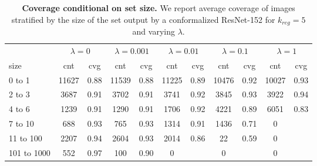 \begin{table}[t]
\centering
\small
\begin{tabular}{lcccccccccc} 
\toprule
         & \multicolumn{2}{c}{$\lambda={0}$}     & \multicolumn{2}{c}{$\lambda={0.001}$}     & \multicolumn{2}{c}{$\lambda={0.01}$}     & \multicolumn{2}{c}{$\lambda={0.1}$}     & \multicolumn{2}{c}{$\lambda={1}$}    \\ 
         \cmidrule(r){1-2}     \cmidrule(r){3-4}     \cmidrule(r){5-6}     \cmidrule(r){7-8}     \cmidrule(r){9-10}    
size &cnt & cvg     &cnt & cvg     &cnt & cvg     &cnt & cvg     &cnt & cvg     \\ 
\midrule 
0 to 1      & 11627 & 0.88  & 11539 & 0.88  & 11225 & 0.89  & 10476 & 0.92  & 10027 & 0.93 \\ 
2 to 3      & 3687 & 0.91  & 3702 & 0.91  & 3741 & 0.92  & 3845 & 0.93  & 3922 & 0.94 \\ 
4 to 6      & 1239 & 0.91  & 1290 & 0.91  & 1706 & 0.92  & 4221 & 0.89  & 6051 & 0.83 \\ 
7 to 10      & 688 & 0.93  & 765 & 0.93  & 1314 & 0.91  & 1436 & 0.71  & 0 & \\ 
11 to 100      & 2207 & 0.94  & 2604 & 0.93  & 2014 & 0.86  & 22 & 0.59  & 0 & \\ 
101 to 1000      & 552 & 0.97  & 100 & 0.90  & 0 &  & 0 &  & 0 & \\ 
\bottomrule
\end{tabular}
\caption{\textbf{Coverage conditional on set size.} We report average coverage of images stratified by the size of the set output by a conformalized ResNet-152 for $k_{reg}=5$ and varying $\lambda$.}
\label{table:adaptiveness}
\end{table}
